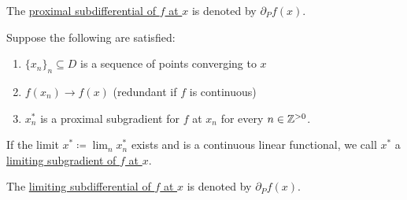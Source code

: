 \begin{definition}
\begin{defenum}
    The \uline{proximal subdifferential of $f$ at $x$} is denoted by $\partial_P f(x)$.

    \item\label{def:subdifferentials/limiting}\cite[definition 11.10]{Clarke2013} Suppose the following are satisfied:
    \begin{enumerate}
      \item $\{ x_n \}_n \subseteq D$ is a sequence of points converging to $x$
      \item $f(x_n) \to f(x)$ (redundant if $f$ is continuous)
      \item $x_n^*$ is a proximal subgradient for $f$ at $x_n$ for every $n \in \mathbb Z^{>0}$.
    \end{enumerate}

    If the limit $x^* \coloneqq \lim_n x_n^*$ exists and is a continuous linear functional, we call $x^*$ a \uline{limiting subgradient of $f$ at $x$}.

    The \uline{limiting subdifferential of $f$ at $x$} is denoted by $\partial_P f(x)$.
  \end{defenum}
\end{definition}

